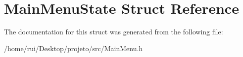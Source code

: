 \hypertarget{structMainMenuState}{}\section{Main\+Menu\+State Struct Reference}
\label{structMainMenuState}


The documentation for this struct was generated from the following file\+:\begin{DoxyCompactItemize}
\item 
/home/rui/\+Desktop/projeto/src/Main\+Menu.\+h\end{DoxyCompactItemize}
